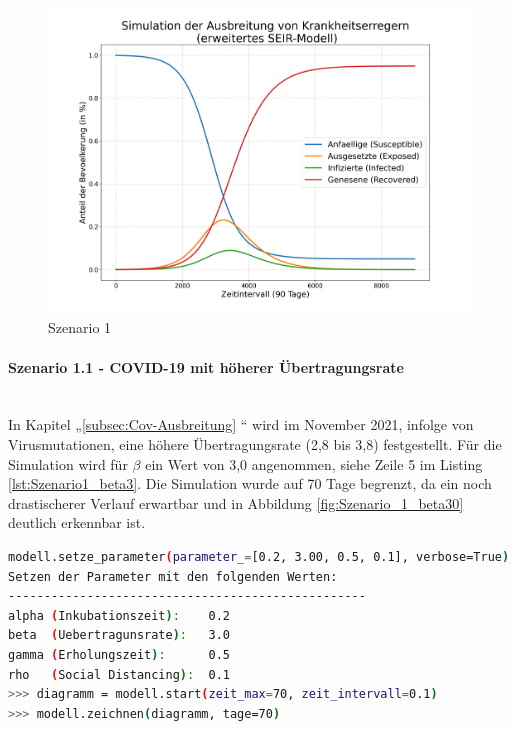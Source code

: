 \documentclass[12pt]{article}
\begin{document}
\begin{figure}[H]
\centering
\includegraphics[scale=0.4]{Szenario_1}
\caption{Szenario 1}
\label{fig:szenario_1}
\end{figure}

\paragraph{Szenario 1.1 - COVID-19 mit höherer Übertragungsrate}\mbox{} \\
In Kapitel „\ref{subsec:Cov-Ausbreitung} “ wird im November 2021, infolge von Virusmutationen, eine höhere Übertragungsrate (2,8 bis 3,8) festgestellt. Für die Simulation wird für $\beta$ ein Wert von 3,0 angenommen, siehe Zeile 5 im Listing \ref{lst:Szenario1_beta3}. Die Simulation wurde auf 70 Tage begrenzt, da ein noch drastischerer Verlauf erwartbar und in Abbildung \ref{fig:Szenario_1_beta30} deutlich erkennbar ist.

\begin{lstlisting}[language=Bash, caption=Szenario 1 - COVID-19 (hohe Übertragungsrate)), label=lst:Szenario1_beta3]
modell.setze_parameter(parameter_=[0.2, 3.00, 0.5, 0.1], verbose=True)
Setzen der Parameter mit den folgenden Werten:
--------------------------------------------------
alpha (Inkubationszeit):    0.2
beta  (Uebertragunsrate):   3.0
gamma (Erholungszeit):      0.5
rho   (Social Distancing):  0.1
>>> diagramm = modell.start(zeit_max=70, zeit_intervall=0.1)
>>> modell.zeichnen(diagramm, tage=70)
\end{lstlisting}
\end{document}
